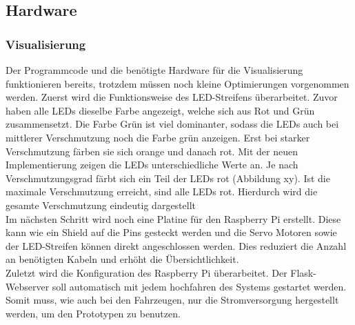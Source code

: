 \documentclass[.../Dokumentation.tex]{subfiles}
\begin{document}
    \subsection{Hardware}\label{sec-ita4-hardware}
        \subsubsection*{Visualisierung}
    Der Programmcode und die benötigte Hardware für die Visualisierung funktionieren bereits, trotzdem müssen noch kleine Optimierungen vorgenommen werden. Zuerst wird die Funktionsweise des LED-Streifens überarbeitet. Zuvor haben alle LEDs dieselbe Farbe angezeigt, welche sich aus Rot und Grün zusammensetzt. Die Farbe Grün ist viel dominanter, sodass die LEDs auch bei mittlerer Verschmutzung noch die Farbe grün anzeigen. Erst bei starker Verschmutzung färben sie sich orange und danach rot. Mit der neuen Implementierung zeigen die LEDs unterschiedliche Werte an. Je nach Verschmutzungsgrad färbt sich ein Teil der LEDs rot (Abbildung xy). Ist die maximale Verschmutzung erreicht, sind alle LEDs rot. Hierdurch wird die gesamte Verschmutzung eindeutig dargestellt\\
    Im nächsten Schritt wird noch eine Platine für den Raspberry Pi erstellt. Diese kann wie ein Shield auf die Pins gesteckt werden und die Servo Motoren sowie der LED-Streifen können direkt angeschlossen werden. Dies reduziert die Anzahl an benötigten Kabeln und erhöht die Übersichtlichkeit.\\
    Zuletzt wird die Konfiguration des Raspberry Pi überarbeitet. Der Flask-Webserver soll automatisch mit jedem hochfahren des Systems gestartet werden. Somit muss, wie auch bei den Fahrzeugen, nur die Stromversorgung hergestellt werden, um den Prototypen zu benutzen.
        
\end{document}
